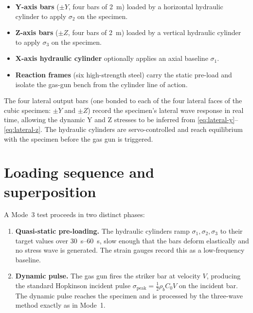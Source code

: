 \documentclass[11pt,a4paper,openany]{book}
\providecommand{\SI}[2]{\qty{#1}{#2}}
\providecommand{\SIrange}[3]{\qtyrange{#1}{#2}{#3}}
\theoremstyle{handbook}
\newcommand{\sig}{\sigma}
\newcommand{\Cz}{C_0}
\newcommand{\sigpeak}{\sig_{\text{peak}}}
\begin{document}
\begin{itemize}[leftmargin=*,itemsep=3pt]
  \item \textbf{Y-axis bars} ($\pm Y$, four bars of \SI{2}{m}) loaded by
        a horizontal hydraulic cylinder to apply $\sig_2$ on the specimen.
  \item \textbf{Z-axis bars} ($\pm Z$, four bars of \SI{2}{m}) loaded by
        a vertical hydraulic cylinder to apply $\sig_3$ on the specimen.
  \item \textbf{X-axis hydraulic cylinder} optionally applies an axial
        baseline $\sig_1$.
  \item \textbf{Reaction frames} (six high-strength steel) carry the
        static pre-load and isolate the gas-gun bench from the cylinder
        line of action.
\end{itemize}

\noindent The four lateral output bars (one bonded to each of the four
lateral faces of the cubic specimen: $\pm Y$ and $\pm Z$) record the
specimen's lateral wave response in real time, allowing the dynamic Y and
Z stresses to be inferred from \eqref{eq:lateral-y}--\eqref{eq:lateral-z}.
The hydraulic cylinders are servo-controlled and reach equilibrium with
the specimen before the gas gun is triggered.

\section{Loading sequence and superposition}

A Mode~3 test proceeds in two distinct phases:

\begin{enumerate}[leftmargin=*,itemsep=3pt]
  \item \textbf{Quasi-static pre-loading.} The hydraulic cylinders ramp
        $\sig_1,\sig_2,\sig_3$ to their target values over
        \SIrange{30}{60}{s}, slow enough that the bars deform elastically
        and no stress wave is generated. The strain gauges record this as
        a low-frequency baseline.
  \item \textbf{Dynamic pulse.} The gas gun fires the striker bar at
        velocity $V$, producing the standard Hopkinson incident pulse
        $\sigpeak=\tfrac{1}{2}\rho_b\Cz V$ on the incident bar. The
        dynamic pulse reaches the specimen and is processed by the
        three-wave method exactly as in Mode~1.
\end{enumerate}
\end{document}
